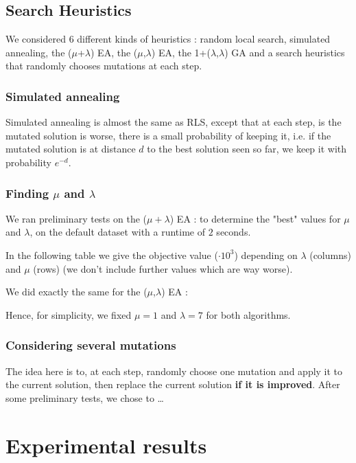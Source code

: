 \documentclass[a4paper]{article}
\begin{document}
\subsection{Search Heuristics}
We considered 6 different kinds of heuristics : random local search, simulated annealing, the ($\mu$+$\lambda$) EA, the ($\mu$,$\lambda$) EA, the 1+($\lambda$,$\lambda$) GA and a search heuristics that randomly chooses mutations at each step.
\subsubsection{Simulated annealing}
Simulated annealing is almost the same as RLS, except that at each step, is the mutated solution is worse, there is a small probability of keeping it, i.e. if the mutated solution is at distance $d$ to the best solution seen so far, we keep it with probability $e^{-d}$.

\subsubsection{Finding $\mu$ and $\lambda$}
We ran preliminary tests on the ($\mu + \lambda$) EA : to determine the "best" values for $\mu$ and $\lambda$, on the default dataset with a runtime of $2$ seconds.

In the following table we give the objective value ($\cdot 10^3$) depending on $\lambda$ (columns) and $\mu$ (rows) (we don't include further values which are way worse). 

\begin{center}
\end{center}

We did exactly the same for the ($\mu$,$\lambda$) EA :


\begin{center}
\end{center}

Hence, for simplicity, we fixed $\mu=1$ and $\lambda=7$ for both algorithms.

\subsubsection{Considering several mutations}
The idea here is to, at each step, randomly choose one mutation and apply it to the current solution, then replace the current solution \textbf{if it is improved}. After some preliminary tests, we chose to …
\section{Experimental results}
\end{document}
